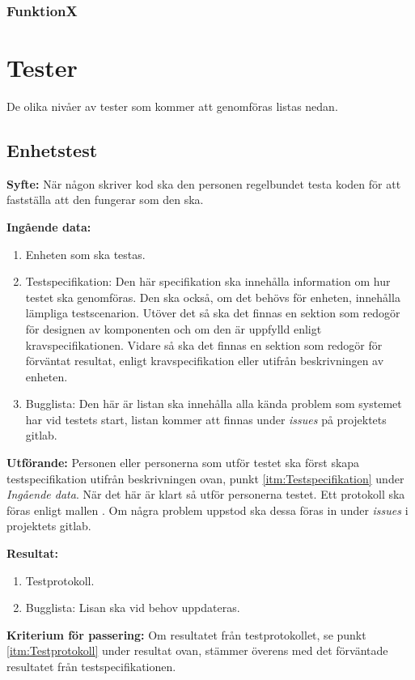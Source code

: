 \documentclass[a4paper,10pt]{article}
\begin{document}
    \subsubsection{FunktionX}

\section{Tester}
De olika nivåer av tester som kommer att genomföras listas nedan.
\subsection{Enhetstest}
  \textbf{Syfte:}
  När någon skriver kod ska den personen regelbundet testa koden för att fastställa att den fungerar som den ska.

  \textbf{Ingående data:}
        \begin{enumerate}
            \item Enheten som ska testas.
            \item \label{itm:Testspecifikation} Testspecifikation: Den här specifikation ska innehålla information om hur testet ska genomföras. Den ska också, om det behövs för enheten, innehålla lämpliga testscenarion. Utöver det så ska det finnas en sektion som redogör för designen av komponenten och om den är uppfylld enligt kravspecifikationen. Vidare så ska det finnas en sektion som redogör för förväntat resultat, enligt kravspecifikation eller utifrån beskrivningen av enheten.
            \item Bugglista: Den här är listan ska innehålla alla kända problem som systemet har vid testets start, listan kommer att finnas under \emph{issues} på projektets gitlab.
        \end{enumerate}
    \textbf{Utförande:} Personen eller personerna som utför testet ska först skapa testspecifikation utifrån beskrivningen ovan, punkt \ref{itm:Testspecifikation} under \emph{Ingående data}. När det här är klart så utför personerna testet. Ett protokoll ska föras enligt mallen . Om några problem uppstod ska dessa föras in under \emph{issues} i projektets gitlab.

    \textbf{Resultat:}
        \begin{enumerate}
            \item \label{tim:Testprotokoll} Testprotokoll.
            \item Bugglista: Lisan ska vid behov uppdateras.
        \end{enumerate}
    \textbf{Kriterium för passering:} Om resultatet från testprotokollet, se punkt \ref{itm:Testprotokoll} under resultat ovan, stämmer överens med det förväntade resultatet från testspecifikationen.
\end{document}
